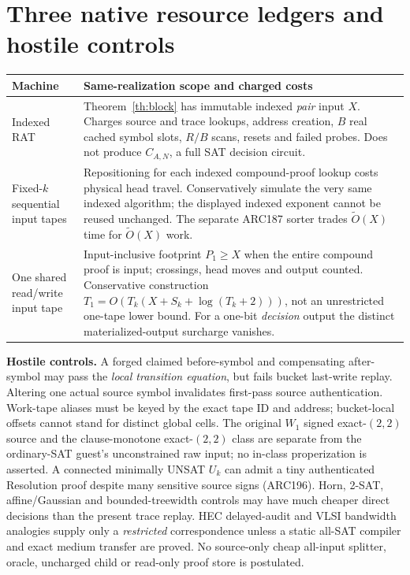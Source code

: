 \documentclass[11pt]{article}
\begin{document}
\section{Three native resource ledgers and hostile controls}
\begin{center}\small
\begin{tabularx}{.97\linewidth}{p{.21\linewidth}X}
\toprule
Machine & Same-realization scope and charged costs\\\midrule
Indexed RAT & Theorem~\ref{th:block} has immutable indexed \emph{pair} input $X$. Charges source and trace lookups, address creation, $B$ real cached symbol slots, $R/B$ scans, resets and failed probes. Does not produce $C_{A,N}$, a full SAT decision circuit.\\
Fixed-$k$ sequential input tapes & Repositioning for each indexed compound-proof lookup costs physical head travel. Conservatively simulate the very same indexed algorithm; the displayed indexed exponent cannot be reused unchanged. The separate ARC187 sorter trades $\widetilde O(X)$ time for $\widetilde O(X)$ work.\\
One shared read/write input tape & Input-inclusive footprint $P_1\ge X$ when the entire compound proof is input; crossings, head moves and output counted. Conservative construction $T_1=O(T_k(X+S_k+\log(T_k+2)))$, not an unrestricted one-tape lower bound. For a one-bit \emph{decision} output the distinct materialized-output surcharge vanishes.\\\bottomrule
\end{tabularx}
\end{center}

\noindent\textbf{Hostile controls.}
A forged claimed before-symbol and compensating after-symbol may pass the \emph{local transition equation}, but fails bucket last-write replay. Altering one actual source symbol invalidates first-pass source authentication. Work-tape aliases must be keyed by the exact tape ID and address; bucket-local offsets cannot stand for distinct global cells. The original $W_1$ signed exact-$(2,2)$ source and the clause-monotone exact-$(2,2)$ class are separate from the ordinary-SAT guest's unconstrained raw input; no in-class properization is asserted. A connected minimally UNSAT $U_k$ can admit a tiny authenticated Resolution proof despite many sensitive source signs (ARC196). Horn, 2-SAT, affine/Gaussian and bounded-treewidth controls may have much cheaper direct decisions than the present trace replay. HEC delayed-audit and VLSI bandwidth analogies supply only a \emph{restricted} correspondence unless a static all-SAT compiler and exact medium transfer are proved. No source-only cheap all-input splitter, oracle, uncharged child or read-only proof store is postulated.
\end{document}
